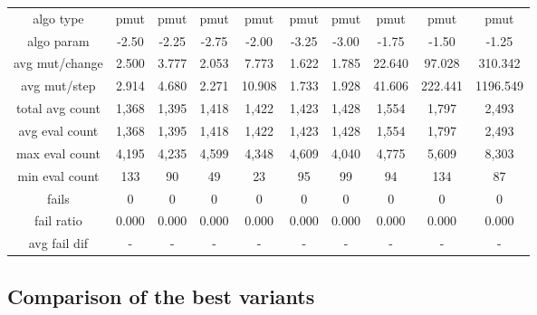 \begin{tabular}[h]{cccccccccc}
algo type&             pmut&      pmut&      pmut&      pmut&      pmut&      pmut&      pmut&      pmut&      pmut\\
algo param&           -2.50&     -2.25&     -2.75&     -2.00&     -3.25&     -3.00&     -1.75&     -1.50&     -1.25\\
avg mut/change&       2.500&     3.777&     2.053&     7.773&     1.622&     1.785&    22.640&    97.028&   310.342\\
avg mut/step&         2.914&     4.680&     2.271&    10.908&     1.733&     1.928&    41.606&   222.441&  1196.549\\
\hline
total avg count&      1,368&     1,395&     1,418&     1,422&     1,423&     1,428&     1,554&     1,797&     2,493\\
avg eval count&       1,368&     1,395&     1,418&     1,422&     1,423&     1,428&     1,554&     1,797&     2,493\\
max eval count&       4,195&     4,235&     4,599&     4,348&     4,609&     4,040&     4,775&     5,609&     8,303\\
min eval count&         133&        90&        49&        23&        95&        99&        94&       134&        87\\
\hline
fails&                    0&         0&         0&         0&         0&         0&         0&         0&         0\\
fail ratio&           0.000&     0.000&     0.000&     0.000&     0.000&     0.000&     0.000&     0.000&     0.000\\
avg fail dif&             -&         -&         -&         -&         -&         -&         -&         -&         -\\
\end{tabular}


\subsection{Comparison of the best variants}


